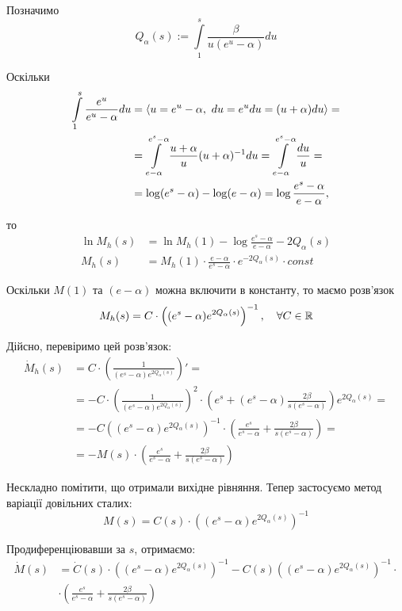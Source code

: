 Позначимо
\begin{equation}
	\label{eq:almost_li_alpha}
	Q_\alpha(s) := \int\limits_1^s \frac{\beta}{u(e^u - \alpha)} du
\end{equation}

Оскільки
\begin{align*}
	\int\limits_1^s \frac{e^u}{e^u - \alpha} du &= \langle u = e^u - \alpha,~ du = e^u du = (u+\alpha) du \rangle = \\
	&= \int\limits_{e-\alpha}^{e^s -\alpha} \frac{u + \alpha}{u} (u+\alpha)^{-1} du = 
	\int\limits_{e-\alpha}^{e^s -\alpha} \frac{du}{u} = \\
	&= \log(e^s - \alpha) - \log(e-\alpha) = \log \frac{e^s - \alpha}{e - \alpha} \text{,}
\end{align*}

то
\begin{align*}
	\ln{M_h (s)} &= \ln{M_h (1)} - \log \frac{e^s - \alpha}{e - \alpha} - 2Q_\alpha(s) \\
	M_h (s) &= M_h (1) \cdot \frac{e - \alpha}{e^s - \alpha} \cdot e^{- 2Q_\alpha(s)} \cdot const
\end{align*}

Оскільки $M(1)$ та $(e-\alpha)$ можна включити в константу, то маємо розв'язок
\begin{equation}
	\label{eq:uniform_right_laplace_homogen_sol}
	M_h (s) = C \cdot \left((e^s - \alpha)  e^{2Q_\alpha(s)}\right)^{-1}, \quad \forall C \in \mathbb{R}
\end{equation}

Дійсно, перевіримо цей розв'язок:
\[
\begin{split}
	\dot M_h (s) &= C \cdot \left(\frac{1}{(e^s - \alpha)  e^{2Q_\alpha(s)}}\right)'=\\
	 &= - C \cdot \left(\frac{1}{(e^s - \alpha)  e^{2Q_\alpha(s)}}\right)^2 \cdot \left(e^s  + (e^s - \alpha) \frac{2\beta}{s(e^s - \alpha)}   \right) e^{2Q_\alpha(s)} =\\
	 &= -C \left((e^s - \alpha)  e^{2Q_\alpha(s)}\right)^{-1} \cdot \left(\frac{e^s}{e^s - \alpha}  + \frac{2\beta}{s(e^s - \alpha)}   \right) =\\
	 &= - M(s) \cdot \left(\frac{e^s}{e^s - \alpha}  + \frac{2\beta}{s(e^s - \alpha)}   \right)
\end{split}
\]

Нескладно помітити, що отримали вихідне рівняння. Тепер застосуємо метод варіації довільних сталих:
$$
	M(s) = C(s) \cdot \left((e^s - \alpha)  e^{2Q_\alpha(s)}\right)^{-1} 
$$

Продиференціювавши за $s$, отримаємо:
\begin{align*}
	\dot M(s) &= \dot C(s) \cdot \left((e^s - \alpha)  e^{2Q_\alpha(s)}\right)^{-1} -C(s) \left((e^s - \alpha)  e^{2Q_\alpha(s)}\right)^{-1} \cdot \\
	&\cdot \left(\frac{e^s}{e^s - \alpha}  + \frac{2\beta}{s(e^s - \alpha)}   \right) 
\end{align*}

